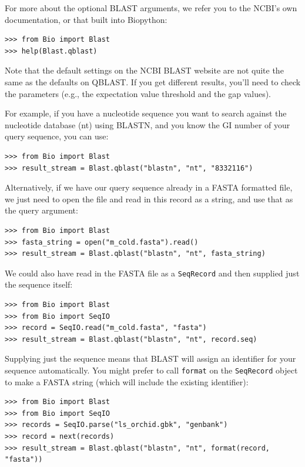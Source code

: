 For more about the optional BLAST arguments, we refer you to the NCBI's own
documentation, or that built into Biopython:

\begin{verbatim}
>>> from Bio import Blast
>>> help(Blast.qblast)
\end{verbatim}

Note that the default settings on the NCBI BLAST website are not quite
the same as the defaults on QBLAST. If you get different results, you'll
need to check the parameters (e.g., the expectation value threshold and
the gap values).

For example, if you have a nucleotide sequence you want to search against
the nucleotide database (nt) using BLASTN, and you know the GI number of your
query sequence, you can use:

\begin{verbatim}
>>> from Bio import Blast
>>> result_stream = Blast.qblast("blastn", "nt", "8332116")
\end{verbatim}

Alternatively, if we have our query sequence already in a FASTA formatted
file, we just need to open the file and read in this record as a string,
and use that as the query argument:

\begin{verbatim}
>>> from Bio import Blast
>>> fasta_string = open("m_cold.fasta").read()
>>> result_stream = Blast.qblast("blastn", "nt", fasta_string)
\end{verbatim}

We could also have read in the FASTA file as a \verb|SeqRecord| and then
supplied just the sequence itself:

\begin{verbatim}
>>> from Bio import Blast
>>> from Bio import SeqIO
>>> record = SeqIO.read("m_cold.fasta", "fasta")
>>> result_stream = Blast.qblast("blastn", "nt", record.seq)
\end{verbatim}

Supplying just the sequence means that BLAST will assign an identifier
for your sequence automatically.  You might prefer to call \verb|format|
on the \verb|SeqRecord| object to make a FASTA string
(which will include the existing identifier):

\begin{verbatim}
>>> from Bio import Blast
>>> from Bio import SeqIO
>>> records = SeqIO.parse("ls_orchid.gbk", "genbank")
>>> record = next(records)
>>> result_stream = Blast.qblast("blastn", "nt", format(record, "fasta"))
\end{verbatim}

